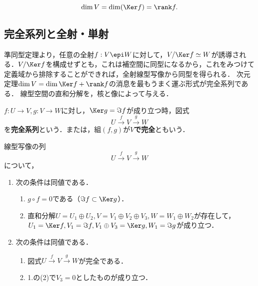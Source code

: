 \documentclass[uplatex, dvipdfmx]{jsreport}
\begin{document}
\begin{corollary}[次元定理]\label{cor-rank-nullity-theorem}
    \[\dim V=\dim(\Ker f)=\rank f.\]
\end{corollary}

\subsection{完全系列と全射・単射}

\begin{tcolorbox}[colframe=ForestGreen, colback=ForestGreen!10!white,breakable,colbacktitle=ForestGreen!40!white,coltitle=black,fonttitle=\bfseries\sffamily,
title=線形写像の全射は極めて奇妙な性質を持つ]
    準同型定理より，任意の全射$f:V\epi W$に対して，$V/\Ker f\simeq W$が誘導される．$V/\Ker f$を構成せずとも，これは補空間に同型になるから，これをみつけて定義域から排除することができれば，全射線型写像から同型を得られる．
    次元定理$\dim V=\dim\Ker f+\rank f$の消息を最もうまく運ぶ形式が完全系列である．
    線型空間の直和分解を，核と像によって与える．
\end{tcolorbox}

\begin{definition}
    $f:U\to V,g:V\to W$に対し，$\Ker g=\Im f$が成り立つ時，図式
    \[ U\xrightarrow{f}V\xrightarrow{g}W \]
    を\textbf{完全系列}という．または，組$(f,g)$が\textbf{$V$で完全}ともいう．
\end{definition}

\begin{lemma}[図式が完全であることの部分空間と直和の言葉による特徴付け]
    線型写像の列
    \[ U\xrightarrow{f}V\xrightarrow{g}W \]
    について，
    \begin{enumerate}
        \item 次の条件は同値である．
        \begin{enumerate}[(1)]
            \item $g\circ f=0$である（$\Im f\subset\Ker g$）．
            \item 直和分解$U=U_1\oplus U_2,V=V_1\oplus V_2\oplus V_3, W=W_1\oplus W_2$が存在して，
            $U_1=\Ker f,V_1=\Im f,V_1\oplus V_3=\Ker g,W_1=\Im g$が成り立つ．
        \end{enumerate}
        \item 次の条件は同値である．
        \begin{enumerate}[(1)]
            \item 図式$U\xrightarrow{f}V\xrightarrow{g}W$が完全である．
            \item 1.の(2)で$V_3=0$としたものが成り立つ．
        \end{enumerate}
    \end{enumerate}
\end{lemma}
\end{document}
